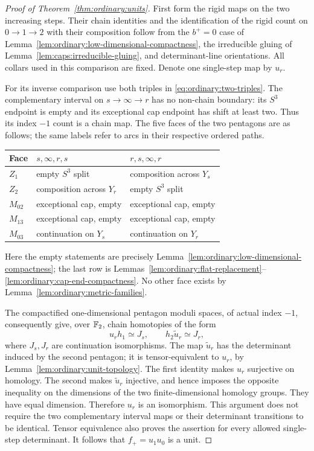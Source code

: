 \begin{proof}[Proof of Theorem~\ref{thm:ordinary:units}]
First form the rigid maps on the two increasing steps.  Their
chain identities and the identification of the rigid count
on $0\to1\to2$ with their composition follow from the
$b^+=0$ case of
Lemma~\ref{lem:ordinary:low-dimensional-compactness}, the irreducible
gluing of Lemma~\ref{lem:caps:irreducible-gluing}, and determinant-line
orientations.  All collars used in this comparison are
fixed.  Denote one single-step map by $u_r$.

For its inverse comparison use both triples in
\eqref{eq:ordinary:two-triples}.  The complementary
interval on $s\to\infty\to r$ has no non-chain
boundary: its $S^3$ endpoint is empty and its exceptional
cap endpoint has shift at least two.  Thus its index
$-1$ count is a chain map.  The five faces of the two
pentagons are as follows; the same labels refer to
arcs in their respective ordered paths.
\begin{center}
\begin{tabular}{@{}lll@{}}
\toprule
Face & $s,\infty,r,s$ & $r,s,\infty,r$\\
\midrule
$Z_1$ & empty $S^3$ split & composition across $Y_s$\\
$Z_2$ & composition across $Y_r$ & empty $S^3$ split\\
$M_{02}$ & exceptional cap, empty & exceptional cap, empty\\
$M_{13}$ & exceptional cap, empty & exceptional cap, empty\\
$M_{03}$ & continuation on $Y_s$ & continuation on $Y_r$\\
\bottomrule
\end{tabular}
\end{center}
Here the empty statements are precisely
Lemma~\ref{lem:ordinary:low-dimensional-compactness};
the last row is
Lemmas~\ref{lem:ordinary:flat-replacement}--\ref{lem:ordinary:cap-end-compactness}.
No other face exists by
Lemma~\ref{lem:ordinary:metric-families}.

The compactified one-dimensional pentagon moduli
spaces, of actual index $-1$, consequently give,
over $\mathbb F_2$, chain homotopies of the form
\begin{equation}\label{eq:ordinary:single-step-identities}
 u_r h_1\simeq J_s,
 \qquad h_2\widetilde u_r\simeq J_r,
\end{equation}
where $J_s,J_r$ are continuation isomorphisms.  The
map $\widetilde u_r$ has the determinant induced by
the second pentagon; it is tensor-equivalent to
$u_r$, by Lemma~\ref{lem:ordinary:unit-topology}.
The first identity makes $u_r$ surjective on homology.
The second makes $\widetilde u_r$ injective, and hence
imposes the opposite inequality on the dimensions of
the two finite-dimensional homology groups.  They
have equal dimension.  Therefore $u_r$ is an
isomorphism.  This argument does not require the
two complementary interval maps or their determinant
transitions to be identical.  Tensor equivalence
also proves the assertion for every allowed
single-step determinant.  It follows that
$f_+=u_1u_0$ is a unit.


\end{proof}
